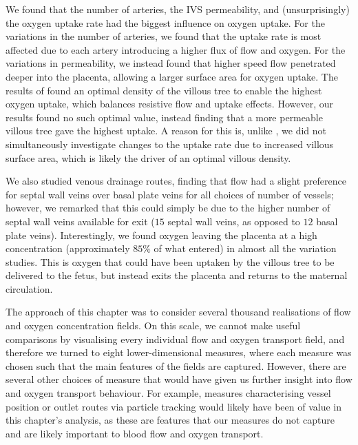         We found that the number of arteries, the IVS permeability, and (unsurprisingly) the oxygen uptake rate had the biggest influence on oxygen uptake. For the variations in the number of arteries, we found that the uptake rate is most affected due to each artery introducing a higher flux of flow and oxygen. For the variations in permeability, we instead found that higher speed flow penetrated deeper into the placenta, allowing a larger surface area for oxygen uptake. The results of \citeauthor{serovOptimalVilliDensity2015} \cite{serovOptimalVilliDensity2015} found an optimal density of the villous tree to enable the highest oxygen uptake, which balances resistive flow and uptake effects. However, our results found no such optimal value, instead finding that a more permeable villous tree gave the highest uptake. A reason for this is, unlike \citeauthor{serovOptimalVilliDensity2015} \cite{serovOptimalVilliDensity2015}, we did not simultaneously investigate changes to the uptake rate due to increased villous surface area, which is likely the driver of an optimal villous density.

        We also studied venous drainage routes, finding that flow had a slight preference for septal wall veins over basal plate veins for all choices of number of vessels; however, we remarked that this could simply be due to the higher number of septal wall veins available for exit ($15$ septal wall veins, as opposed to $12$ basal plate veins). Interestingly, we found oxygen leaving the placenta at a high concentration (approximately $85\%$ of what entered) in almost all the variation studies. This is oxygen that could have been uptaken by the villous tree to be delivered to the fetus, but instead exits the placenta and returns to the maternal circulation.

        The approach of this chapter was to consider several thousand realisations of flow and oxygen concentration fields. On this scale, we cannot make useful comparisons by visualising every individual flow and oxygen transport field, and therefore we turned to eight lower-dimensional measures, where each measure was chosen such that the main features of the fields are captured. However, there are several other choices of measure that would have given us further insight into flow and oxygen transport behaviour. For example, measures characterising vessel position or outlet routes via particle tracking would likely have been of value in this chapter's analysis, as these are features that our measures do not capture and are likely important to blood flow and oxygen transport.

